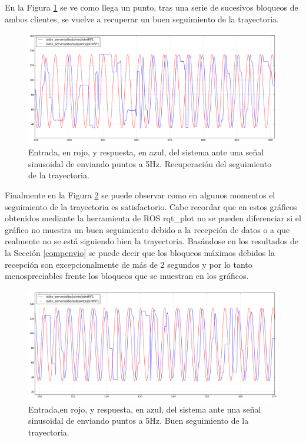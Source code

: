 \documentclass[12pt,a4paper,final,twoside]{article}
\begin{document}
En la Figura \ref{fig:ASrecupera} se ve como llega un punto, tras una serie de sucesivos bloqueos de ambos clientes, se vuelve a recuperar un buen seguimiento de la trayectoria.
 
\begin{figure}[H]
	\centering
    \includegraphics[scale=0.375]{images/sinlegWR/mejorado/recupera.png}
 	\caption{Entrada, en rojo, y respuesta, en azul, del sistema ante una señal sinusoidal de enviando puntos a 5Hz. Recuperación del seguimiento de la trayectoria.}
  \label{fig:ASrecupera}
\end{figure}

Finalmente en la Figura \ref{fig:ASbuena} se puede observar como en algunos momentos el seguimiento de la trayectoria es satisfactorio. Cabe recordar que en estos gráficos obtenidos mediante la herramienta de ROS rqt{\_}plot no se pueden diferenciar si el gráfico no muestra un buen seguimiento debido a la recepción de datos o a que realmente no se está siguiendo bien la trayectoria. Basándose en los resultados de la Sección \ref{compenvio} se puede decir que los bloqueos máximos debidos la recepción son excepcionalmente de más de 2 segundos y por lo tanto menospreciables frente los bloqueos que se muestran en los gráficos.
 \begin{figure}[H]
	\centering
    \includegraphics[scale=0.38]{images/sinlegWR/mejorado/mejor5Hz.png}
 	\caption{Entrada,en rojo, y respuesta, en azul, del sistema ante una señal sinusoidal de enviando puntos a 5Hz. Buen seguimiento de la trayectoria.}
  \label{fig:ASbuena}
\end{figure}
\end{document}
